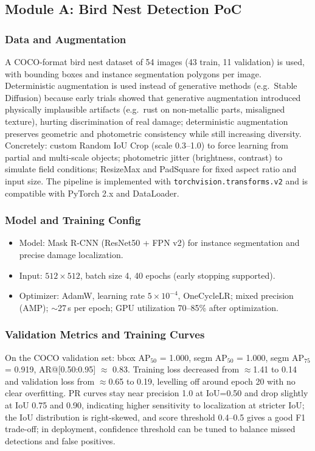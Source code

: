 \documentclass[12pt,a4paper]{article}
\begin{document}
\subsection{Module A: Bird Nest Detection PoC}

\subsubsection{Data and Augmentation}

A COCO-format bird nest dataset of 54 images (43 train, 11 validation) is used, with bounding boxes and instance segmentation polygons per image. Deterministic augmentation is used instead of generative methods (e.g.\ Stable Diffusion) because early trials showed that generative augmentation introduced physically implausible artifacts (e.g.\ rust on non-metallic parts, misaligned texture), hurting discrimination of real damage; deterministic augmentation preserves geometric and photometric consistency while still increasing diversity. Concretely: custom Random IoU Crop (scale 0.3--1.0) to force learning from partial and multi-scale objects; photometric jitter (brightness, contrast) to simulate field conditions; ResizeMax and PadSquare for fixed aspect ratio and input size. The pipeline is implemented with \texttt{torchvision.transforms.v2} and is compatible with PyTorch 2.x and DataLoader.

\subsubsection{Model and Training Config}

\begin{itemize}
  \item Model: Mask R-CNN (ResNet50 + FPN v2) for instance segmentation and precise damage localization.
  \item Input: $512\times512$, batch size 4, 40 epochs (early stopping supported).
  \item Optimizer: AdamW, learning rate $5\times10^{-4}$, OneCycleLR; mixed precision (AMP); $\sim$27\,s per epoch; GPU utilization 70--85\% after optimization.
\end{itemize}

\subsubsection{Validation Metrics and Training Curves}

On the COCO validation set: bbox AP$_{50}$ = 1.000, segm AP$_{50}$ = 1.000, segm AP$_{75}$ = 0.919, AR@[0.50:0.95] $\approx$ 0.83. Training loss decreased from $\approx$1.41 to 0.14 and validation loss from $\approx$0.65 to 0.19, levelling off around epoch 20 with no clear overfitting. PR curves stay near precision 1.0 at IoU=0.50 and drop slightly at IoU 0.75 and 0.90, indicating higher sensitivity to localization at stricter IoU; the IoU distribution is right-skewed, and score threshold 0.4--0.5 gives a good F1 trade-off; in deployment, confidence threshold can be tuned to balance missed detections and false positives.
\end{document}
